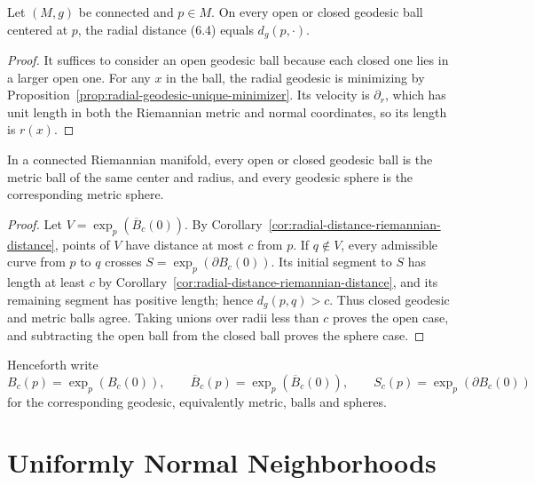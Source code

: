 \begin{corollary}
\label{cor:radial-distance-riemannian-distance}
\leanok
{}

Let $(M,g)$ be connected and $p\in M$.  On every open or closed geodesic ball
centered at $p$, the radial distance (6.4) equals $d_g(p,\mathord\cdot)$.
\end{corollary}

\begin{proof}
\sketch
It suffices to consider an open geodesic ball because each closed one lies in
a larger open one.  For any $x$ in the ball, the radial geodesic is minimizing
by Proposition~\ref{prop:radial-geodesic-unique-minimizer}.  Its velocity is
$\partial_r$, which has unit length in both the Riemannian metric and normal
coordinates, so its length is $r(x)$.
\end{proof}

\begin{corollary}
\label{cor:geodesic-ball-metric-ball}
\leanok
{}

In a connected Riemannian manifold, every open or closed geodesic ball is the
metric ball of the same center and radius, and every geodesic sphere is the
corresponding metric sphere.
\end{corollary}

\begin{proof}
\sketch
Let $V=\exp_p(\overline B_c(0))$.  By
Corollary~\ref{cor:radial-distance-riemannian-distance}, points of $V$ have
distance at most $c$ from $p$.  If $q\notin V$, every admissible curve from
$p$ to $q$ crosses $S=\exp_p(\partial B_c(0))$.  Its initial segment to $S$
has length at least $c$ by
Corollary~\ref{cor:radial-distance-riemannian-distance}, and its remaining
segment has positive length; hence $d_g(p,q)>c$.  Thus closed geodesic and
metric balls agree.  Taking unions over radii less than $c$ proves the open
case, and subtracting the open ball from the closed ball proves the sphere
case.
\end{proof}

Henceforth write
\[
B_c(p)=\exp_p(B_c(0)),
\qquad
\overline B_c(p)=\exp_p(\overline B_c(0)),
\qquad
S_c(p)=\exp_p(\partial B_c(0))
\]
for the corresponding geodesic, equivalently metric, balls and spheres.
\section{Uniformly Normal Neighborhoods}

